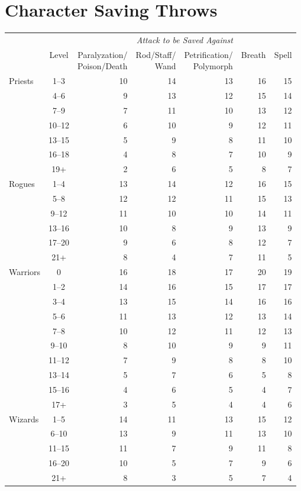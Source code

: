 \documentclass[10pt,letterpaper]{article}
\begin{document}
\noindent
\begin{minipage}[t]{0.660\textwidth}
  \section*{Character Saving Throws}
  \small
  \begin{tabularx}{\textwidth}{Xcrrrrr}
    \toprule
    & & \multicolumn{5}{c}{\textit{Attack to be Saved Against}} \\
    & Level
    & \makecell{Paralyzation/\\Poison/Death}
    & \makecell{Rod/Staff/\\Wand}
    & \makecell{Petrification/\\Polymorph}
    & Breath
    & Spell \\
    \midrule
    Priests
    &  1--3  & 10 & 14 & 13 & 16 & 15 \\
    &  4--6  &  9 & 13 & 12 & 15 & 14 \\
    &  7--9  &  7 & 11 & 10 & 13 & 12 \\
    & 10--12 &  6 & 10 &  9 & 12 & 11 \\
    & 13--15 &  5 &  9 &  8 & 11 & 10 \\
    & 16--18 &  4 &  8 &  7 & 10 &  9 \\
    &   19+  &  2 &  6 &  5 &  8 &  7 \\
    \midrule
    Rogues
    &  1--4  & 13 & 14 & 12 & 16 & 15 \\
    &  5--8  & 12 & 12 & 11 & 15 & 13 \\
    &  9--12 & 11 & 10 & 10 & 14 & 11 \\
    & 13--16 & 10 &  8 &  9 & 13 &  9 \\
    & 17--20 &  9 &  6 &  8 & 12 &  7 \\
    &   21+  &  8 &  4 &  7 & 11 &  5 \\
    \midrule
    Warriors
    &    0   & 16 & 18 & 17 & 20 & 19 \\
    &  1--2  & 14 & 16 & 15 & 17 & 17 \\
    &  3--4  & 13 & 15 & 14 & 16 & 16 \\
    &  5--6  & 11 & 13 & 12 & 13 & 14 \\
    &  7--8  & 10 & 12 & 11 & 12 & 13 \\
    &  9--10 &  8 & 10 &  9 &  9 & 11 \\
    & 11--12 &  7 &  9 &  8 &  8 & 10 \\
    & 13--14 &  5 &  7 &  6 &  5 &  8 \\
    & 15--16 &  4 &  6 &  5 &  4 &  7 \\
    &   17+  &  3 &  5 &  4 &  4 &  6 \\
    \midrule
    Wizards
    &  1--5  & 14 & 11 & 13 & 15 & 12 \\
    &  6--10 & 13 &  9 & 11 & 13 & 10 \\
    & 11--15 & 11 &  7 &  9 & 11 &  8 \\
    & 16--20 & 10 &  5 &  7 &  9 &  6 \\
    &   21+  &  8 &  3 &  5 &  7 &  4 \\
    \bottomrule
  \end{tabularx}
\end{minipage}
\end{document}
